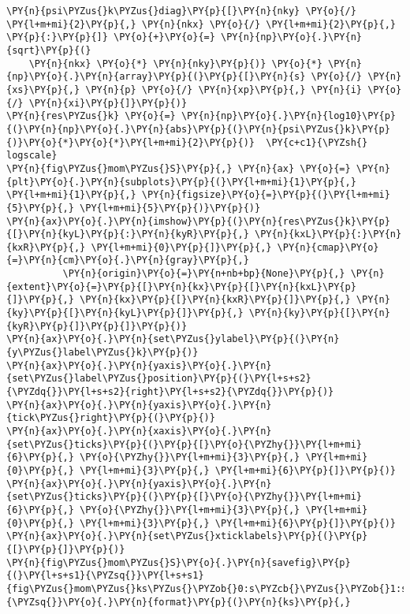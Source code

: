\begin{Verbatim}[commandchars=\\\{\}]
\PY{n}{psi\PYZus{}k\PYZus{}diag}\PY{p}{[}\PY{n}{nky} \PY{o}{/} \PY{l+m+mi}{2}\PY{p}{,} \PY{n}{nkx} \PY{o}{/} \PY{l+m+mi}{2}\PY{p}{,} \PY{p}{:}\PY{p}{]} \PY{o}{+}\PY{o}{=} \PY{n}{np}\PY{o}{.}\PY{n}{sqrt}\PY{p}{(}
    \PY{n}{nkx} \PY{o}{*} \PY{n}{nky}\PY{p}{)} \PY{o}{*} \PY{n}{np}\PY{o}{.}\PY{n}{array}\PY{p}{(}\PY{p}{[}\PY{n}{s} \PY{o}{/} \PY{n}{xs}\PY{p}{,} \PY{n}{p} \PY{o}{/} \PY{n}{xp}\PY{p}{,} \PY{n}{i} \PY{o}{/} \PY{n}{xi}\PY{p}{]}\PY{p}{)}
\PY{n}{res\PYZus{}k} \PY{o}{=} \PY{n}{np}\PY{o}{.}\PY{n}{log10}\PY{p}{(}\PY{n}{np}\PY{o}{.}\PY{n}{abs}\PY{p}{(}\PY{n}{psi\PYZus{}k}\PY{p}{)}\PY{o}{*}\PY{o}{*}\PY{l+m+mi}{2}\PY{p}{)}  \PY{c+c1}{\PYZsh{} logscale}
\PY{n}{fig\PYZus{}mom\PYZus{}S}\PY{p}{,} \PY{n}{ax} \PY{o}{=} \PY{n}{plt}\PY{o}{.}\PY{n}{subplots}\PY{p}{(}\PY{l+m+mi}{1}\PY{p}{,} \PY{l+m+mi}{1}\PY{p}{,} \PY{n}{figsize}\PY{o}{=}\PY{p}{(}\PY{l+m+mi}{5}\PY{p}{,} \PY{l+m+mi}{5}\PY{p}{)}\PY{p}{)}
\PY{n}{ax}\PY{o}{.}\PY{n}{imshow}\PY{p}{(}\PY{n}{res\PYZus{}k}\PY{p}{[}\PY{n}{kyL}\PY{p}{:}\PY{n}{kyR}\PY{p}{,} \PY{n}{kxL}\PY{p}{:}\PY{n}{kxR}\PY{p}{,} \PY{l+m+mi}{0}\PY{p}{]}\PY{p}{,} \PY{n}{cmap}\PY{o}{=}\PY{n}{cm}\PY{o}{.}\PY{n}{gray}\PY{p}{,}
          \PY{n}{origin}\PY{o}{=}\PY{n+nb+bp}{None}\PY{p}{,} \PY{n}{extent}\PY{o}{=}\PY{p}{[}\PY{n}{kx}\PY{p}{[}\PY{n}{kxL}\PY{p}{]}\PY{p}{,} \PY{n}{kx}\PY{p}{[}\PY{n}{kxR}\PY{p}{]}\PY{p}{,} \PY{n}{ky}\PY{p}{[}\PY{n}{kyL}\PY{p}{]}\PY{p}{,} \PY{n}{ky}\PY{p}{[}\PY{n}{kyR}\PY{p}{]}\PY{p}{]}\PY{p}{)}
\PY{n}{ax}\PY{o}{.}\PY{n}{set\PYZus{}ylabel}\PY{p}{(}\PY{n}{y\PYZus{}label\PYZus{}k}\PY{p}{)}
\PY{n}{ax}\PY{o}{.}\PY{n}{yaxis}\PY{o}{.}\PY{n}{set\PYZus{}label\PYZus{}position}\PY{p}{(}\PY{l+s+s2}{\PYZdq{}}\PY{l+s+s2}{right}\PY{l+s+s2}{\PYZdq{}}\PY{p}{)}
\PY{n}{ax}\PY{o}{.}\PY{n}{yaxis}\PY{o}{.}\PY{n}{tick\PYZus{}right}\PY{p}{(}\PY{p}{)}
\PY{n}{ax}\PY{o}{.}\PY{n}{xaxis}\PY{o}{.}\PY{n}{set\PYZus{}ticks}\PY{p}{(}\PY{p}{[}\PY{o}{\PYZhy{}}\PY{l+m+mi}{6}\PY{p}{,} \PY{o}{\PYZhy{}}\PY{l+m+mi}{3}\PY{p}{,} \PY{l+m+mi}{0}\PY{p}{,} \PY{l+m+mi}{3}\PY{p}{,} \PY{l+m+mi}{6}\PY{p}{]}\PY{p}{)}
\PY{n}{ax}\PY{o}{.}\PY{n}{yaxis}\PY{o}{.}\PY{n}{set\PYZus{}ticks}\PY{p}{(}\PY{p}{[}\PY{o}{\PYZhy{}}\PY{l+m+mi}{6}\PY{p}{,} \PY{o}{\PYZhy{}}\PY{l+m+mi}{3}\PY{p}{,} \PY{l+m+mi}{0}\PY{p}{,} \PY{l+m+mi}{3}\PY{p}{,} \PY{l+m+mi}{6}\PY{p}{]}\PY{p}{)}
\PY{n}{ax}\PY{o}{.}\PY{n}{set\PYZus{}xticklabels}\PY{p}{(}\PY{p}{[}\PY{p}{]}\PY{p}{)}
\PY{n}{fig\PYZus{}mom\PYZus{}S}\PY{o}{.}\PY{n}{savefig}\PY{p}{(}\PY{l+s+s1}{\PYZsq{}}\PY{l+s+s1}{fig\PYZus{}mom\PYZus{}ks\PYZus{}\PYZob{}0:s\PYZcb{}\PYZus{}\PYZob{}1:s\PYZcb{}}\PY{l+s+s1}{\PYZsq{}}\PY{o}{.}\PY{n}{format}\PY{p}{(}\PY{n}{ks}\PY{p}{,}

\end{Verbatim}
